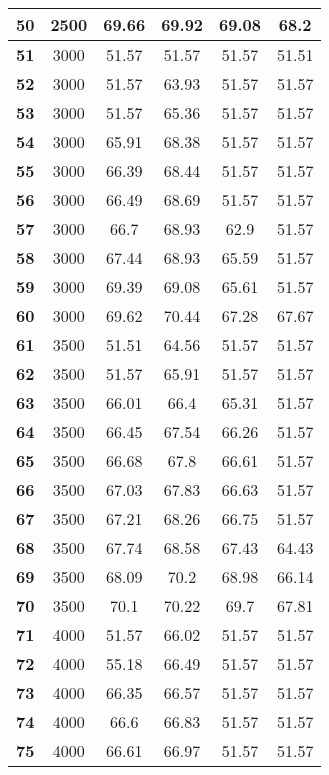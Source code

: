 \begin{longtable}{|c|c|c|c|c|c|}
\textbf{50} & 2500 & 69.66 & 69.92 & 69.08 & 68.2 \\ \hline 
\textbf{51} & 3000 & 51.57 & 51.57 & 51.57 & 51.51 \\ \hline 
\textbf{52} & 3000 & 51.57 & 63.93 & 51.57 & 51.57 \\ \hline 
\textbf{53} & 3000 & 51.57 & 65.36 & 51.57 & 51.57 \\ \hline 
\textbf{54} & 3000 & 65.91 & 68.38 & 51.57 & 51.57 \\ \hline 
\textbf{55} & 3000 & 66.39 & 68.44 & 51.57 & 51.57 \\ \hline 
\textbf{56} & 3000 & 66.49 & 68.69 & 51.57 & 51.57 \\ \hline 
\textbf{57} & 3000 & 66.7 & 68.93 & 62.9 & 51.57 \\ \hline 
\textbf{58} & 3000 & 67.44 & 68.93 & 65.59 & 51.57 \\ \hline 
\textbf{59} & 3000 & 69.39 & 69.08 & 65.61 & 51.57 \\ \hline 
\textbf{60} & 3000 & 69.62 & 70.44 & 67.28 & 67.67 \\ \hline 
\textbf{61} & 3500 & 51.51 & 64.56 & 51.57 & 51.57 \\ \hline 
\textbf{62} & 3500 & 51.57 & 65.91 & 51.57 & 51.57 \\ \hline 
\textbf{63} & 3500 & 66.01 & 66.4 & 65.31 & 51.57 \\ \hline 
\textbf{64} & 3500 & 66.45 & 67.54 & 66.26 & 51.57 \\ \hline 
\textbf{65} & 3500 & 66.68 & 67.8 & 66.61 & 51.57 \\ \hline 
\textbf{66} & 3500 & 67.03 & 67.83 & 66.63 & 51.57 \\ \hline 
\textbf{67} & 3500 & 67.21 & 68.26 & 66.75 & 51.57 \\ \hline 
\textbf{68} & 3500 & 67.74 & 68.58 & 67.43 & 64.43 \\ \hline 
\textbf{69} & 3500 & 68.09 & 70.2 & 68.98 & 66.14 \\ \hline 
\textbf{70} & 3500 & 70.1 & 70.22 & 69.7 & 67.81 \\ \hline 
\textbf{71} & 4000 & 51.57 & 66.02 & 51.57 & 51.57 \\ \hline 
\textbf{72} & 4000 & 55.18 & 66.49 & 51.57 & 51.57 \\ \hline 
\textbf{73} & 4000 & 66.35 & 66.57 & 51.57 & 51.57 \\ \hline 
\textbf{74} & 4000 & 66.6 & 66.83 & 51.57 & 51.57 \\ \hline 
\textbf{75} & 4000 & 66.61 & 66.97 & 51.57 & 51.57 \\ \hline 

\end{longtable}
